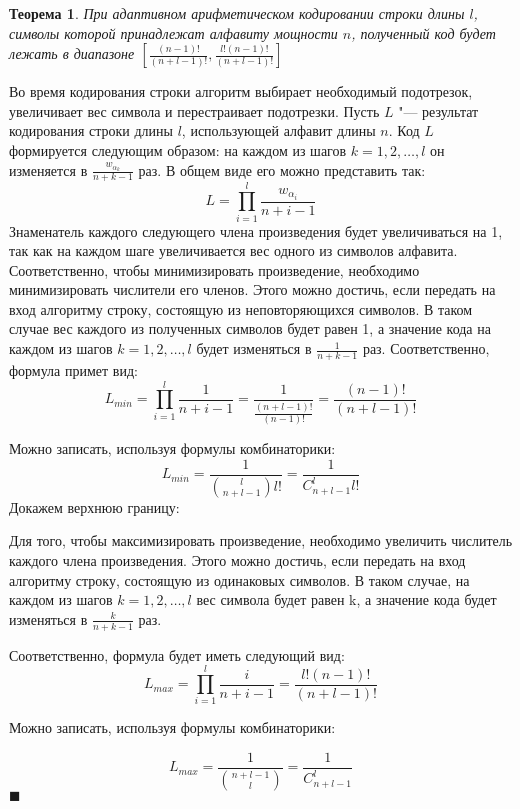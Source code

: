 \documentclass[12pt]{article}
\begin{document}
\newtheorem{Th}{Теорема}
\begin{Th}
При адаптивном арифметическом кодировании строки длины $l$, символы которой принадлежат алфавиту мощности $n$, полученный код будет лежать в диапазоне $[\frac{(n-1)!}{(n+l-1)!}, \frac{l!(n-1)!}{(n+l-1)!}]$
\end{Th}
\newenvironment{Proof}
	{\par{}}
	{\hfill$\scriptstyle\blacksquare$}
\begin{Proof}
Во время кодирования строки алгоритм выбирает необходимый подотрезок, увеличивает вес символа и перестраивает подотрезки.
Пусть $L$ "--- результат кодирования строки длины $l$, использующей алфавит длины $n$. Код $L$ формируется следующим образом: на каждом из шагов $k=1, 2, \dots, l$
он изменяется в $\frac{w_{\alpha_k}}{n+k-1}$ раз.
В общем виде его можно представить так:
\[
L = \prod_{i=1}^l \frac{w_{\alpha_i}}{n+i-1}
\]
Знаменатель каждого следующего члена произведения  будет увеличиваться на 1, так как на каждом шаге увеличивается вес одного из символов алфавита.
Соответственно, чтобы минимизировать произведение, необходимо минимизировать числители его членов.
Этого можно достичь, если передать на вход алгоритму строку, состоящую из неповторяющихся символов.
В таком случае вес каждого из полученных символов будет равен 1, а значение кода на каждом из шагов $k=1, 2, \dots, l$ будет изменяться в $\frac{1}{n+k-1}$ раз.
Соответственно, формула примет вид:
\[
L_{min} = \prod_{i=1}^l \frac{1}{n+i-1} = \frac{1}{\frac{(n+l-1)!}{(n-1)!}} = \frac{(n-1)!}{(n+l-1)!}
\]

Можно записать, используя формулы комбинаторики:
\[
L_{min} = \frac{1}{{\binom{l}{n+l-1}}l!} = \frac{1}{C_{n+l-1}^{l}l!}
\]
Докажем верхнюю границу:

Для того, чтобы максимизировать произведение, необходимо увеличить числитель каждого члена произведения. Этого можно достичь, если передать на вход алгоритму строку, состоящую из одинаковых символов. В таком случае, на каждом из шагов $k=1, 2, \dots, l$ вес символа будет равен k, а значение кода будет изменяться в $\frac{k}{n+k-1}$ раз.

Соответственно, формула будет иметь следующий вид:
\[
L_{max} = \prod_{i=1}^l \frac{i}{n+i-1} = \frac{l!(n-1)!}{(n+l-1)!}
\]

Можно записать, используя формулы комбинаторики:

\[
L_{max} = \frac{1}{\binom{n+l-1}{l}} = \frac{1}{C_{n+l-1}^{l}}
\]
\end{Proof}
\end{document}
